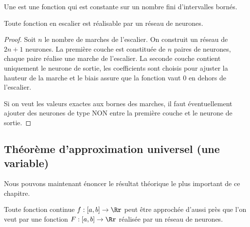 \documentclass[11pt,class=report,crop=false]{standalone}
\begin{document}
Une  est une fonction qui est constante sur un nombre fini d'intervalles bornés.




\begin{proposition}
Toute fonction en escalier est réalisable par un réseau de neurones.
\end{proposition}

\begin{proof}
Soit $n$ le nombre de marches de l'escalier.
On construit un réseau de $2n+1$ neurones. La première couche est constituée de $n$ paires de neurones, chaque paire réalise une marche de l'escalier. La seconde couche contient uniquement le neurone de sortie, les coefficients sont choisis pour ajuster la hauteur de la marche et le biais assure que la fonction vaut $0$ en dehors de l'escalier.

Si on veut les valeurs exactes aux bornes des marches, il faut éventuellement ajouter des neurones de type \og{}NON\fg{} entre la première couche et le neurone de sortie.
\end{proof}

\subsection{Théorème d'approximation universel (une variable)}


Nous pouvons maintenant énoncer le résultat théorique le plus important de ce chapitre.

\begin{theoreme}
Toute fonction continue $f : [a,b] \to \Rr$ peut être approchée d'aussi près que l'on veut par une fonction $F : [a,b] \to \Rr$ réalisée par un réseau de neurones.
\end{theoreme}
\end{document}
